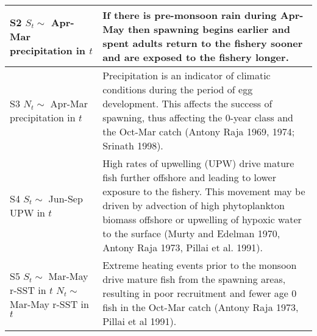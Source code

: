 \begin{table}
\begin{tabular}[t]{>{\raggedright\arraybackslash}p{5.5cm}|>{\raggedright\arraybackslash}p{10cm}}
\hline
S2 \newline $S_t \sim$ Apr-Mar precipitation in $t$ & If there is pre-monsoon rain during Apr-May then spawning begins earlier and spent adults return to the fishery sooner and are exposed to the fishery longer.\\
\hline
S3 \newline $N_t \sim$ Apr-Mar precipitation in $t$ & Precipitation is an indicator of climatic conditions during the period of egg development. This affects the success of spawning, thus affecting the 0-year class and the Oct-Mar catch (Antony Raja 1969, 1974; Srinath 1998).\\
\hline
S4 \newline $S_t \sim$ Jun-Sep UPW in $t$ & High rates of upwelling (UPW) drive mature fish further offshore and leading to lower exposure to the fishery.  This movement may be driven by advection of high phytoplankton biomass offshore or upwelling of hypoxic water to the surface (Murty and Edelman 1970, Antony Raja 1973, Pillai et al. 1991).\\
\hline
S5 \newline $S_t \sim$ Mar-May r-SST in $t$ \newline $N_t \sim$ Mar-May r-SST in $t$ & Extreme heating events prior to the monsoon drive mature fish from the spawning areas, resulting in poor recruitment and fewer age 0 fish in the Oct-Mar catch (Antony Raja 1973, Pillai et al 1991).\\
\hline
\end{tabular}
\end{table}

